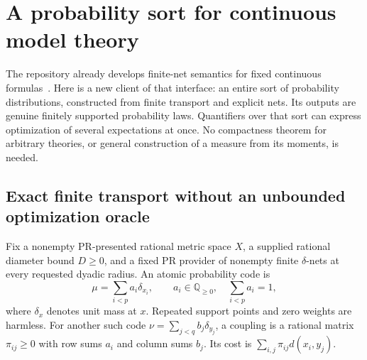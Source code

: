 \section{A probability sort for continuous model theory}
\label{sec:probability-models}

The repository already develops finite-net semantics for fixed continuous
formulas~\cite{repo-recent}.  Here is a new client of that interface: an
entire sort of probability distributions, constructed from finite transport
and explicit nets.  Its outputs are genuine finitely supported probability
laws.  Quantifiers over that sort can express optimization of several
expectations at once.  No compactness theorem for arbitrary theories, or
general construction of a measure from its moments, is needed.

\subsection{Exact finite transport without an unbounded optimization oracle}

Fix a nonempty PR-presented rational metric space \(X\), a supplied rational
diameter bound \(D\geq0\), and a fixed PR provider of nonempty finite
\(\delta\)-nets at every requested dyadic radius.  An atomic probability code is
\[
 \mu=\sum_{i<p}a_i\delta_{x_i},\qquad
 a_i\in\mathbb Q_{\geq0},\quad \sum_{i<p}a_i=1,
\]
where \(\delta_x\) denotes unit mass at \(x\).  Repeated support points
and zero weights are harmless.  For another such code
\(\nu=\sum_{j<q}b_j\delta_{y_j}\), a coupling is a rational matrix
\(\pi_{ij}\geq0\) with row sums \(a_i\) and column sums \(b_j\).
Its cost is \(\sum_{i,j}\pi_{ij}d(x_i,y_j)\).

